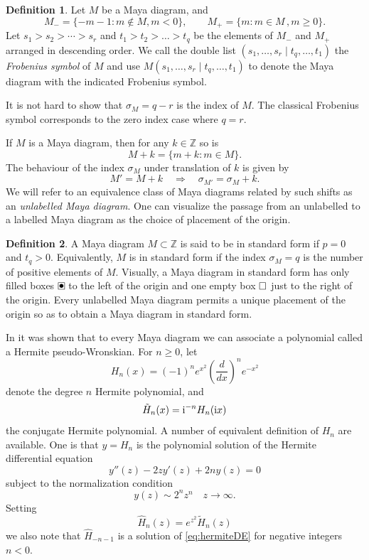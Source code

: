 \documentclass{amsart}
\theoremstyle{definition}
\newtheorem{definition}{Definition}
\newcommand{\Z}{\mathbb{Z}}
\newcommand{\hh}{\hat{H}}
\renewcommand{\th}{\tilde{H}}
\newcommand{\h}{H}
\renewcommand{\boxdot}{{\ \clap{\raise0.25ex\hbox{$\bullet$}}\clap{$\square$}\ }}
\newcommand{\emptybox}{\hbox{$\square$}}
\begin{document}
\begin{definition}
  \label{def:frobsymb}
  Let $M$ be a Maya diagram, and
  \[ M_-= \{ -m-1 \colon m\notin M, m<0\},\qquad M_+ = \{ m\colon m\in
    M\,, m\geq 0 \}. \] Let $s_1>s_2>\cdots > s_r$ and
  $t_1> t_2>\dots> t_q$ be the elements of $M_-$ and $M_+$ arranged in
  descending order.  We call the double list
  $(s_1,\ldots, s_r \mid t_q,\ldots, t_1)$ the \textit{Frobenius symbol}
  of $M$ and use $M(s_1,\ldots, s_r\mid t_q,\ldots, t_1)$ to denote the
  Maya diagram with the indicated Frobenius symbol.
\end{definition}
\noindent
It is not hard to show that $\sigma_M=q-r$ is the index of $M$.  The
classical Frobenius symbol
\cite{andrews2004integer,olsson1994combinatorics,andrews1998theory}
corresponds to the zero index case where $q=r$.

If $M$ is a Maya diagram, then for any $k\in \Z$ so is
\[ M+k = \{ m+k \colon m\in M \}.\] The behaviour of the index
$\sigma_M$ under translation of $k$ is given by
\begin{equation}\label{eq:indexshift}
M'=M+k\quad \Rightarrow \quad \sigma_{M'}=\sigma_M+k.
\end{equation}
We will refer to an equivalence class of Maya diagrams related by such
shifts as an \textit{unlabelled Maya diagram}. One can visualize the
passage from an unlabelled to a labelled Maya diagram as the choice of
placement of the origin.



\begin{definition}
  A Maya diagram $M\subset \Z$ is said to be in standard form if $p=0$
  and $t_q>0$.  Equivalently, $M$ is in standard form if the index
  $\sigma_M=q$ is the number of positive elements of $M$.
  Visually, a Maya diagram in standard form has only filled boxes
  $\boxdot$ to the left of the origin and one empty box
  $\emptybox$ just to the right of the origin. Every unlabelled Maya
  diagram permits a unique placement of the origin so as to obtain a
  Maya diagram in standard form.
\end{definition}

In \cite{gomez2018durfee} it was shown that to every Maya diagram we
can associate a polynomial called a Hermite pseudo-Wronskian.
For $n\geq 0$, let
\begin{equation}
  \label{eq:Hndef}
  H_n(x) = (-1)^n e^{x^2} \left( \frac{d}{dx}\right)^n e^{-x^2}
\end{equation}
denote the degree $n$ Hermite polynomial, and
\begin{equation}
  \label{eq:thndef}
  \th_n(x)={\rm i}^{-n} \h_{n}({\rm i}x)
\end{equation}
the conjugate Hermite polynomial.  A number of  equivalent definition of $H_n$ are available.  One is that
$y=H_n$ is the  polynomial solution of the Hermite differential
equation
\begin{equation}
  \label{eq:hermiteDE}
  y''(z)-2z y'(z) + 2n y(z)=0
\end{equation}
subject to the  normalization condition
\[ y(z) \sim 2^n z^n\quad z\to \infty.\]
Setting
\[ \hh_n(z)= e^{z^2}\th_{n}(z) \] we also note that $\hh_{-n-1}$ is a
solution of \eqref{eq:hermiteDE} for negative integers $n<0$.
\end{document}

